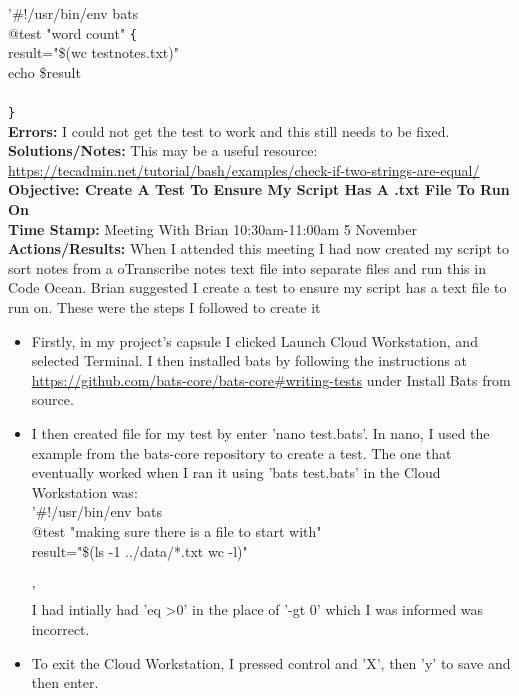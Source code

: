 \documentclass{article}
\begin{document}
\begin{FlushLeft}
'\#!/usr/bin/env bats\\
@test "word count" \verb|{|\\
result="\$(wc test\textunderscore notes.txt)"\\
echo \$result\\
[ "\$result" eq 17 test\textunderscore notes.txt" ]\\
\verb|}|\\
\textbf{Errors:} I could not get the test to work and this still needs to be fixed.\\
\textbf{Solutions/Notes:} This may be a useful resource: \url{https://tecadmin.net/tutorial/bash/examples/check-if-two-strings-are-equal/}\\
\vspace{5mm}
\textbf{Objective: Create A Test To Ensure My Script Has A .txt File To Run On}\\
\textbf{Time Stamp:} Meeting With Brian 10:30am-11:00am 5 November\\
\textbf{Actions/Results:} When I attended this meeting I had now created my script to sort notes from a oTranscribe notes text file into separate files and run this in Code Ocean. Brian suggested I create a test to ensure my script has a text file to run on. These were the steps I followed to create it
\begin{itemize}
    \item Firstly, in my project's capsule I clicked Launch Cloud Workstation, and selected Terminal. I then installed bats by following the instructions at \url{https://github.com/bats-core/bats-core#writing-tests} under Install Bats from source.
    \item I then created file for my test by enter 'nano test.bats'. In nano, I used the example from the bats-core repository to create a test. The one that eventually worked when I ran it using 'bats test.bats' in the Cloud Workstation was:\\
    '#!/usr/bin/env bats\\
    @test "making sure there is a file to start with" {\\
    result="\$(ls -1 ../data/*.txt \textbar{} wc -l)"\\
  [ "\$result" -gt 0 ]\\
  }'\\
  I had intially had 'eq \textgreater{}0' in the place of '-gt 0' which I was informed was incorrect.
  \item To exit the Cloud Workstation, I pressed control and 'X', then 'y' to save and then enter.

\end{itemize}
\end{FlushLeft}
\end{document}
